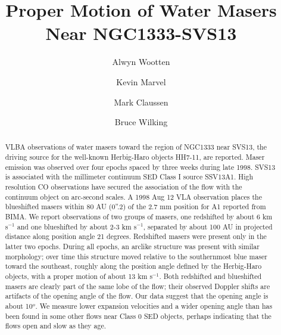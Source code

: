 \pagestyle{myheadings}
\nofiles

\setcounter{page}{1}

\title{Proper Motion of Water Masers Near NGC1333-SVS13}
\author{Alwyn Wootten }
\author{Kevin Marvel}
\author{Mark Claussen}
\author{Bruce Wilking}

\begin{abstract}
VLBA observations of water masers toward the region of NGC1333 near SVS13, 
the driving source for the well-known Herbig-Haro objects HH7-11, are reported. 
Maser emission was observed over four epochs spaced by three weeks during 
late 1998.   SVS13 is associated with the millimeter continuum SED Class I 
source SSV13A1.  High resolution CO observations have secured the association 
of the flow with the continuum object on arc-second scales.  A 1998 Aug 12 
VLA observation places the blueshifted masers within 80 AU (0''.2) of the 
2.7 mm position for A1 reported from BIMA.  We report observations of two 
groups of masers, one redshifted by about 6 km s$^{-1}$ and one blueshifted 
by about  2-3 km s$^{-1}$, separated by about 100 AU in projected distance 
along position angle 21 degrees.  Redshifted masers were present only in 
the latter two epochs.  During all epochs, an arclike structure was present 
with similar morphology; over time this structure moved relative to the 
southernmost blue maser toward the southeast, roughly along the position 
angle defined by the Herbig-Haro objects, with a proper motion of about 
13 km s$^{-1}$.  Both redshifted and blueshifted masers are clearly part 
of the same lobe of the flow; their observed Doppler shifts are artifacts 
of the opening angle of the flow.  Our data suggest that the opening angle 
is about 10$^o$.  We measure lower expansion velocities and a wider opening 
angle than has been found in some other flows near Class 0 SED objects, 
perhaps indicating that the flows open and slow as they age.


\end{abstract}


